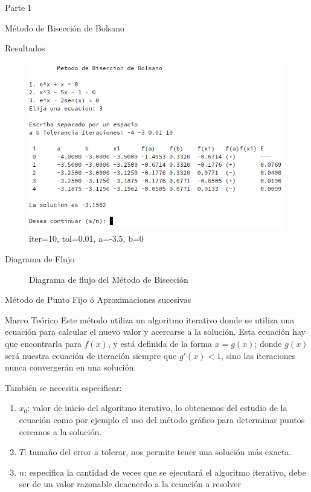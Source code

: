 \documentclass[legalpaper, 12pt]{article}
\begin{document}
\begin{section}{Parte I}
\begin{subsection}{Método de Bisección de Bolsano}
\begin{subsubsection}{Resultados}
\begin{enumerate}
\begin{figure}[h]
            \includegraphics[scale=0.75]{bisec3.png}
            \caption{iter=10, tol=0.01, a=-3.5, b=0}
          \end{figure}
        \end{enumerate}
      \end{subsubsection}
      \newpage
      \begin{subsubsection}{Diagrama de Flujo}
        \begin{figure}[h]
          \centering
          
          \caption{Diagrama de flujo del Método de Bisección}
        \end{figure}
      \end{subsubsection}
      \break
    \end{subsection}
    \break
    \begin{subsection}{Método de Punto Fijo ó Aproximaciones sucesivas}
      \begin{subsubsection}{Marco Teórico}
        Este método utiliza un algoritmo iterativo donde se utiliza una ecuación para calcular el nuevo valor y acercarse a la solución. Esta ecuación hay que encontrarla para $f(x)$, y está definida de la forma $x=g(x)$; donde $g(x)$ será nuestra ecuación de iteración siempre que $g'(x) < 1$, sino las iteraciones nunca convergerán en una solución.

        También se necesita especificar:
        \begin{enumerate}
          \item $x_0$: valor de inicio del algoritmo iterativo, lo obtenemos del estudio de la ecuación como por ejemplo el uso del método gráfico para determinar puntos cercanos a la solución.
          \item $T$: tamaño del error a tolerar, nos permite tener una solución más exacta.
          \item $n$: especifica la cantidad de veces que se ejecutará el algoritmo iterativo, debe ser de un valor razonable deacuerdo a la ecuación a resolver
        \end{enumerate}


\end{subsubsection}
\end{subsection}
\end{section}
\end{document}
